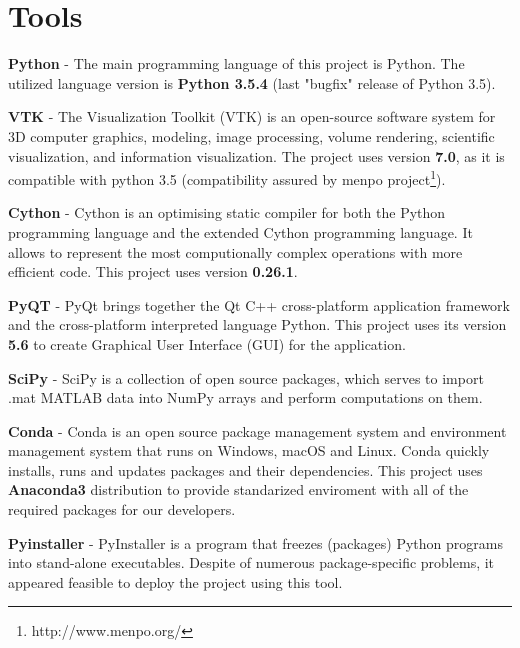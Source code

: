 \section{Tools}

\textbf{Python} - The main programming language of this project is Python. The utilized language version is \textbf{Python 3.5.4} (last "bugfix" release of Python 3.5).

\textbf{VTK} - The Visualization Toolkit (VTK) is an open-source software system for 3D computer graphics, modeling, image processing, volume rendering, scientific visualization, and information visualization.
The project uses version \textbf{7.0}, as it is compatible with python 3.5 (compatibility assured by menpo project\footnote{http://www.menpo.org/}).

\textbf{Cython} - Cython is an optimising static compiler for both the Python programming language and the extended Cython programming language. It allows to represent the most computionally complex operations with more efficient code. This project uses version \textbf{0.26.1}.

\textbf{PyQT} - PyQt brings together the Qt C++ cross-platform application framework and the cross-platform interpreted language Python. This project uses its version \textbf{5.6} to create Graphical User Interface (GUI) for the application.

\textbf{SciPy} - SciPy is a collection of open source packages, which serves to import .mat MATLAB data into NumPy arrays and perform computations on them.

\textbf{Conda} - Conda is an open source package management system and environment management system that runs on Windows, macOS and Linux. Conda quickly installs, runs and updates packages and their dependencies. This project uses \textbf{Anaconda3} distribution to provide standarized enviroment with all of the required packages for our developers.

\textbf{Pyinstaller} - PyInstaller is a program that freezes (packages) Python programs into stand-alone executables. Despite of numerous package-specific problems, it appeared feasible to deploy the project using this tool.